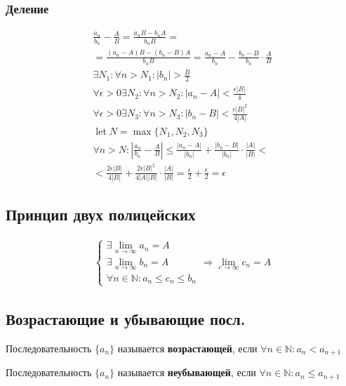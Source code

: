 \documentclass{article}
\DeclareMathOperator*{\Let}{let}
\begin{document}
\subsubsection{Деление}

\begin{gather*}
	\frac{a_n}{b_n} - \frac{A}{B} = \frac{a_nB - b_nA}{b_nB} = \\
	= \frac{(a_n - A)B - (b_n - B)A}{b_nB} = \frac{a_n - A}{b_n} - \frac{b_n - B}{b_n} \cdot \frac{A}{B} \\
	\exists N_1 : \forall n > N_1 : |b_n| > \frac{B}{2} \\
	\forall \epsilon > 0 \exists N_2 : \forall n > N_2 : |a_n - A| < \frac{\epsilon|B|}{4} \\
	\forall \epsilon > 0 \exists N_3 : \forall n > N_3 : |b_n - B| < \frac{\epsilon|B|^2}{4|A|} \\
	\Let N = \max\{N_1, N_2, N_3\} \\
	\forall n > N : |\frac{a_n}{b_n} - \frac{A}{B}| \le \frac{|a_n - A|}{|b_n|} +
	\frac{|b_n - B|}{|b_n|} \cdot \frac{|A|}{|B|} < \\
	< \frac{2\epsilon|B|}{4|B|} + \frac{2\epsilon|B|^2}{4|A||B|} \cdot \frac{|A|}{|B|} =
	\frac{\epsilon}{2} + \frac{\epsilon}{2} = \epsilon
\end{gather*}

\subsection{Принцип двух полицейских}

\begin{gather*}
	\begin{cases}
		\exists \lim_{n \to \infty} a_n = A \\
		\exists \lim_{n \to \infty} b_n = A \\
		\forall n \in \mathbb{N} : a_n \le c_n \le b_n
	\end{cases} \Rightarrow \lim_{c \to \infty} c_n = A
\end{gather*}

\subsection{Возрастающие и убывающие посл.}

Последовательность $\{ a_n \}$ называется \textbf{возрастающей}, если $\forall n \in \mathbb{N} : a_n < a_{n + 1}$

Последовательность $\{ a_n \}$ называется \textbf{неубывающей}, если $\forall n \in \mathbb{N} : a_n \le a_{n + 1}$
\end{document}
